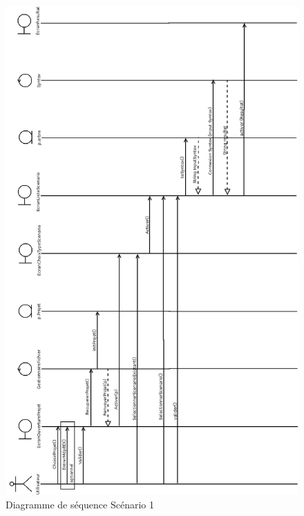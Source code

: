 \documentclass[12pt]{report}
\begin{document}
\begin{figure}[h!]
\begin{center}
\includegraphics[scale=0.34]{DiagSeq.png}
\caption{Diagramme de séquence Scénario 1}
\end{center}
\end{figure}
\end{document}
